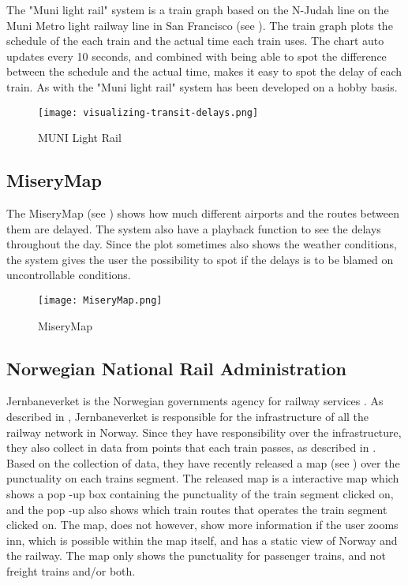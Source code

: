 The "Muni light rail" system is a train graph based on the N-Judah line on the 
Muni Metro light railway line in San Francisco (see ). 
The train graph plots the schedule of the each train and the actual time each 
train uses. The chart auto updates every 10 seconds, and combined with being 
able to spot the difference between the schedule and the actual time, makes it 
easy to spot the delay of each train. As with 
the "Muni light rail" system has been developed on a hobby basis.

\begin{figure}[!htbp]
	\texttt{[image: visualizing-transit-delays.png]}
	\caption[MUNI Light Rail]{MUNI Light Rail \cite{muniLightRail}}
	\label{fig:muniLightRail}
\end{figure}

\subsection{MiseryMap}
\label{sub:subsection_zugmonitor}

The MiseryMap (see ) shows how much different airports and 
the routes between them are delayed. The system also have a playback function 
to see the delays throughout the day. Since the plot sometimes also shows the 
weather conditions, the system gives the user the possibility to spot if the 
delays is to be blamed on uncontrollable conditions. 

\begin{figure}[!htbp]
	\texttt{[image: MiseryMap.png]}
	\caption[MiseryMap]{MiseryMap \cite{flightAware:MiseryMap}}
	\label{fig:miserymap}
\end{figure}
 
\subsection{Norwegian National Rail Administration}
\label{sub:subsection_jernbaneverket}

Jernbaneverket is the Norwegian governments agency for railway services 
\cite{jernbaneverketAbout}. As described in , 
Jernbaneverket is responsible for the infrastructure of all the railway 
network in Norway. Since they have responsibility over the infrastructure, 
they also collect in data from points that each train passes, as described in 
. Based on the collection of data, they have recently 
released a map (see ) over the punctuality 
on each trains segment. The released map is a interactive map which shows a pop
-up box containing the punctuality of the train segment clicked on, and the pop
-up also shows which train routes that operates the train segment clicked on. 
The map, does not however, show more information if the user zooms inn, which 
is possible within the map itself, and has a static view of Norway and the 
railway. The map only shows the punctuality for passenger trains, and not 
freight trains and/or both.\\ 

